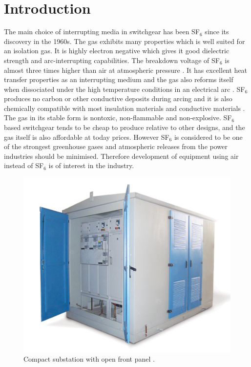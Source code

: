 \documentclass[10pt,a4paper,twoside]{article}
\begin{document}
\cleardoublepage
\setcounter{page}{1}
\tableofcontents
\cleardoublepage

\section{Introduction}
The main choice of interrupting media in switchgear has been SF$_6$ since its discovery in the 1960s. The gas exhibits many properties which is well suited for an isolation gas. It is highly electron negative which gives it good dielectric strength and arc-interrupting capabilities. The breakdown voltage of SF$_6$ is almost three times higher than air at atmospheric pressure \cite{bib:SF6PI}. It has excellent heat transfer properties as an interrupting medium and the gas also reforms itself when dissociated under the high temperature conditions in an electrical arc  \cite{bib:SF6PI}. SF$_6$ produces no carbon or other conductive deposits during arcing and it is also chemically compatible with most insulation materials and conductive materials \cite{bib:SF6PI}. The gas in its stable form is nontoxic, non-flammable and non-explosive. SF$_6$ based switchgear tends to be cheap to produce relative to other designs, and the gas itself is also affordable at today prices. However SF$_6$ is considered to be one of the strongest greenhouse gases and atmospheric releases from the power industries should be minimised. Therefore development of equipment using air instead of SF$_6$ is of interest in the industry.

\begin{figure} [h]
\centering
\includegraphics[scale=0.5]{Bilder/Introduction/general_substation.jpg}
\caption{Compact substation with open front panel \cite{bib:comSub}.} \label{fig:compact substation}
\end{figure}
\end{document}
